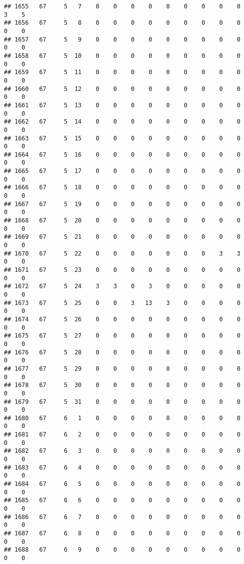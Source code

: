 \documentclass[]{article}
\begin{document}
\begin{verbatim}
## 1655   67     5   7    0    0    0    0    0    0    0    0    0    3    5
## 1656   67     5   8    0    0    0    0    0    0    0    0    0    0    0
## 1657   67     5   9    0    0    0    0    0    0    0    0    0    0    0
## 1658   67     5  10    0    0    0    0    0    0    0    0    0    0    0
## 1659   67     5  11    0    0    0    0    0    0    0    0    0    0    0
## 1660   67     5  12    0    0    0    0    0    0    0    0    0    0    0
## 1661   67     5  13    0    0    0    0    0    0    0    0    0    0    0
## 1662   67     5  14    0    0    0    0    0    0    0    0    0    0    0
## 1663   67     5  15    0    0    0    0    0    0    0    0    0    0    0
## 1664   67     5  16    0    0    0    0    0    0    0    0    0    0    0
## 1665   67     5  17    0    0    0    0    0    0    0    0    0    0    0
## 1666   67     5  18    0    0    0    0    0    0    0    0    0    0    0
## 1667   67     5  19    0    0    0    0    0    0    0    0    0    0    0
## 1668   67     5  20    0    0    0    0    0    0    0    0    0    0    0
## 1669   67     5  21    0    0    0    0    0    0    0    0    0    0    0
## 1670   67     5  22    0    0    0    0    0    0    0    3    3    0    0
## 1671   67     5  23    0    0    0    0    0    0    0    0    0    0    0
## 1672   67     5  24    3    3    0    3    0    0    0    0    0    0    0
## 1673   67     5  25    0    0    3   13    3    0    0    0    0    0    0
## 1674   67     5  26    0    0    0    0    0    0    0    0    0    0    0
## 1675   67     5  27    0    0    0    0    0    0    0    0    0    0    0
## 1676   67     5  28    0    0    0    0    0    0    0    0    0    0    0
## 1677   67     5  29    0    0    0    0    0    0    0    0    0    0    0
## 1678   67     5  30    0    0    0    0    0    0    0    0    0    0    0
## 1679   67     5  31    0    0    0    0    0    0    0    0    0    0    0
## 1680   67     6   1    0    0    0    0    0    0    0    0    0    0    0
## 1681   67     6   2    0    0    0    0    0    0    0    0    0    0    0
## 1682   67     6   3    0    0    0    0    0    0    0    0    0    0    0
## 1683   67     6   4    0    0    0    0    0    0    0    0    0    0    0
## 1684   67     6   5    0    0    0    0    0    0    0    0    0    0    0
## 1685   67     6   6    0    0    0    0    0    0    0    0    0    0    0
## 1686   67     6   7    0    0    0    0    0    0    0    0    0    0    0
## 1687   67     6   8    0    0    0    0    0    0    0    0    0    0    0
## 1688   67     6   9    0    0    0    0    0    0    0    0    0    0    0

\end{verbatim}
\end{document}

